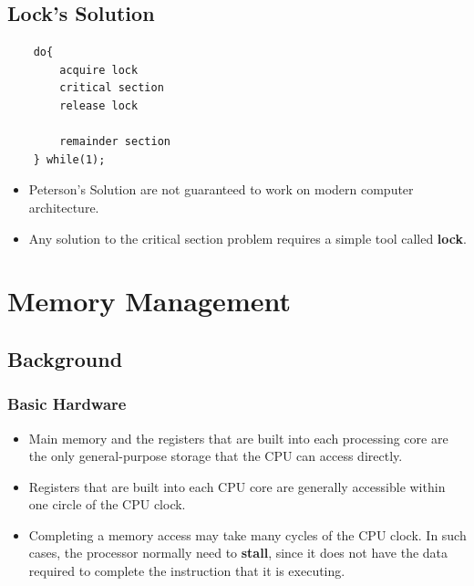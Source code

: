 \documentclass[10pt]{article}
\newcommand{\tf}{\textbf}
\begin{document}
\subsection{Lock's Solution}

\begin{verbatim}
	do{
		acquire lock
		critical section
		release lock

		remainder section
	} while(1);
\end{verbatim}

\begin{itemize}
	\item Peterson's Solution are not guaranteed to work on modern computer architecture.
	\item Any solution to the critical section problem requires a simple tool called \tf{lock}. 
\end{itemize}


\newpage
\section{Memory Management}

\subsection{Background}

\subsubsection{Basic Hardware}

\begin{itemize}
	\item Main memory and the registers that are built into each processing core are the only general-purpose storage that the CPU can access directly.
	\item Registers that are built into each CPU core are generally accessible within one circle of the CPU clock.
	\item Completing a memory access may take many cycles of the CPU clock. In such cases, the processor normally need to \tf{stall}, since it does not have the data required to complete the instruction that it is executing.
\end{itemize}
\end{document}
